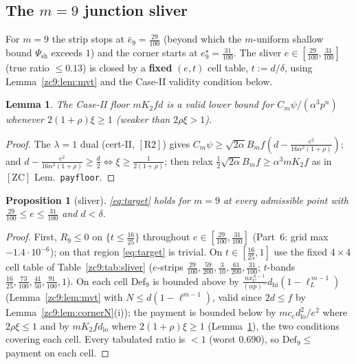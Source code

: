 \documentclass[11pt]{amsart}
\newtheorem{lemma}[theorem]{Lemma}
\newtheorem{proposition}[theorem]{Proposition}
\newcommand{\Def}{\mathrm{Def}}
\newcommand{\RII}{[\textrm{R2}]}
\newcommand{\ZC}{[\textrm{ZC}]}
\begin{document}
\subsection{The $m=9$ junction sliver}\label{zc9:sec:sliver}

For $m=9$ the strip stops at $\bar e_9=\tfrac{29}{100}$ (beyond which the
$m$-uniform shallow bound $\Psi_{\mathrm{sh}}$ exceeds $1$) and the corner
starts at $e^\star_9=\tfrac{31}{100}$.  The sliver
$e\in[\tfrac{29}{100},\tfrac{31}{100}]$ (true ratio $\le0.13$) is closed by a
\textbf{fixed} $(e,t)$ cell table, $t:=d/\delta$, using
Lemma~\ref{zc9:lem:mvt} and the Case-II validity condition below.

\begin{lemma}\label{zc9:lem:certIIval}
The Case-II floor $mK_2fd$ is a valid lower bound for $C_m\psi/(\alpha^3p^{n})$
whenever $2(1+\rho)\xi\ge1$ (weaker than $2\rho\xi>1$).
\end{lemma}
\begin{proof}
The $\lambda=1$ dual (cert-II, $\RII$) gives $C_m\psi\ge\sqrt{2\alpha}B_mf
(d-\tfrac{e^2}{16\alpha^2(1+\rho)})$; and
$d-\tfrac{e^2}{16\alpha^2(1+\rho)}\ge\tfrac d2\iff\xi\ge\tfrac1{2(1+\rho)}$; then
relax $\tfrac12\sqrt{2\alpha}B_mf\ge\alpha^3mK_2f$ as in $\ZC$
Lem.~\texttt{payfloor}.
\end{proof}

\begin{proposition}[sliver]\label{zc9:prop:sliver}
\eqref{eq:target} holds for $m=9$ at every admissible point with
$\tfrac{29}{100}\le e\le\tfrac{31}{100}$ and $d<\delta$.
\end{proposition}

\begin{proof}
First, $R_9\le0$ on $\{t\le\tfrac{16}{25}\}$ throughout
$e\in[\tfrac{29}{100},\tfrac{31}{100}]$ (Part~6: grid max $-1.4\cdot10^{-6}$); on
that region \eqref{eq:target} is trivial.  On $t\in[\tfrac{16}{25},1]$ use the
fixed $4\times4$ cell table of Table~\ref{zc9:tab:sliver} ($e$-strips
$\tfrac{29}{100},\tfrac{59}{200},\tfrac3{10},\tfrac{61}{200},\tfrac{31}{100}$;
$t$-bands $\tfrac{16}{25},\tfrac{73}{100},\tfrac{41}{50},\tfrac{91}{100},1$).  On
each cell $\Def_9$ is bounded above by
$\tfrac{n x_U^{\,n-1}}{(\alpha p)^-}d_{\mathrm{hi}}(1-\ell_L^{\,m-1})$
(Lemma~\ref{zc9:lem:mvt} with $N\le d(1-\ell^{m-1})$, valid since $2d\le f$ by
Lemma~\ref{zc9:lem:cornerN}(i)); the payment is bounded below by
$mc_e d_{\mathrm{lo}}^2/e^2$ where $2\rho\xi\le1$ and by $mK_2fd_{\mathrm{lo}}$
where $2(1+\rho)\xi\ge1$ (Lemma~\ref{zc9:lem:certIIval}), the two conditions
covering each cell.  Every tabulated ratio is $<1$ (worst $0.690$), so
$\Def_9\le$ payment on each cell.
\end{proof}
\end{document}
